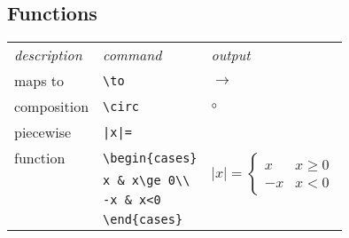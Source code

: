 \begin{multicols}{3}
\subsection{Functions}
\begin{tabular}{lll}
\emph{description} & \emph{command} & \emph{output}\\
maps to & \verb!\to! & $\to$\\
composition& \verb!\circ! & $\circ$\\
piecewise& \verb!|x|=! & \multirow{5}{*}{$\displaystyle |x|=\begin{cases}x&x\ge 0\\-x&x<0\end{cases}$}\\
function&\verb!\begin{cases}!&\\ 
&\verb!x & x\ge 0\\!&\\ 
&\verb!-x & x<0!&\\ 
&\verb!\end{cases}!&
\end{tabular}


\end{multicols}
